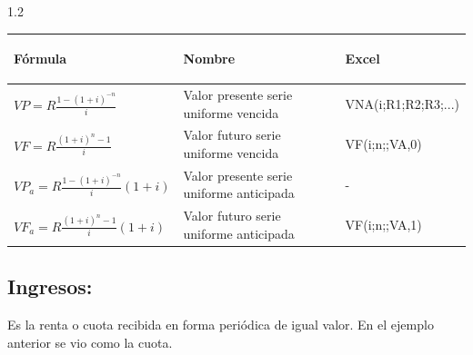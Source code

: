 \begin{spacing}{1.2}
	\begin{center}
		\begin{tabular}{ |p{4.2cm}|p{5.7cm}| p{4cm}|}
			\hline
			\rowcolor{MyOrange}              %
			\begin{center}\textbf{Fórmula} \end{center}                                      & \begin{center} \textbf{Nombre}\end{center}                         & \begin{center} \textbf{Excel} \end{center} \\ \hline


			$VP = R  \frac{1-(1 + i)^{-n}}{i} $\hspace{35pt}               & Valor presente serie uniforme vencida             & VNA(i;R1;R2;R3;...)       \\ \hline


			$VF = R  \frac{(1 + i)^n-1}{i} $                               & Valor futuro serie uniforme vencida \hspace{35pt} & VF(i;n;;VA,0)             \\  \hline


			$VP_{a} = R  \frac{1-(1 + i)^{-n}}{i}  (1 + i) $ \hspace{35pt} & Valor presente serie uniforme anticipada          & -                         \\ \hline

			$VF_{a} = R  \frac{(1 + i)^n-1}{i}   (1 + i) $ \hspace{35pt}   & Valor futuro serie uniforme anticipada            & VF(i;n;;VA,1)             \\ \hline
		\end{tabular}
	\end{center}
\end{spacing}




	\subsection{Ingresos:} Es la renta o cuota recibida en forma periódica de igual valor. En el ejemplo anterior se vio como la cuota.
